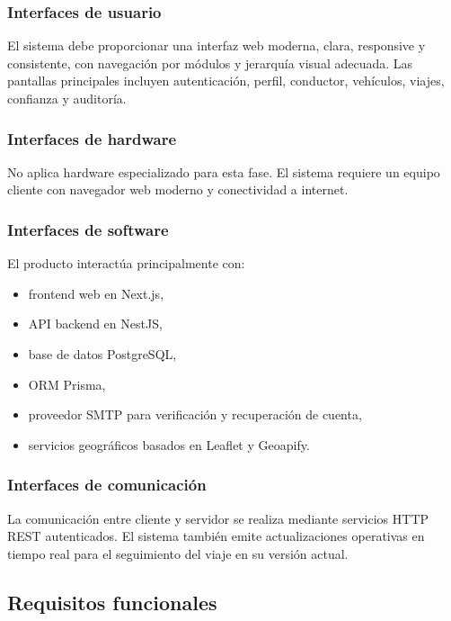 \documentclass[12pt]{article}
\begin{document}
\subsubsection{Interfaces de usuario}

El sistema debe proporcionar una interfaz web moderna, clara, responsive y consistente, con navegaci\'on por m\'odulos y jerarqu\'ia visual adecuada. Las pantallas principales incluyen autenticaci\'on, perfil, conductor, veh\'iculos, viajes, confianza y auditor\'ia.

\subsubsection{Interfaces de hardware}

No aplica hardware especializado para esta fase. El sistema requiere un equipo cliente con navegador web moderno y conectividad a internet.

\subsubsection{Interfaces de software}

El producto interact\'ua principalmente con:

\begin{itemize}[leftmargin=1.2cm]
    \item frontend web en Next.js,
    \item API backend en NestJS,
    \item base de datos PostgreSQL,
    \item ORM Prisma,
    \item proveedor SMTP para verificaci\'on y recuperaci\'on de cuenta,
    \item servicios geogr\'aficos basados en Leaflet y Geoapify.
\end{itemize}

\subsubsection{Interfaces de comunicaci\'on}

La comunicaci\'on entre cliente y servidor se realiza mediante servicios HTTP REST autenticados. El sistema tambi\'en emite actualizaciones operativas en tiempo real para el seguimiento del viaje en su versi\'on actual.

\subsection{Requisitos funcionales}
\end{document}
